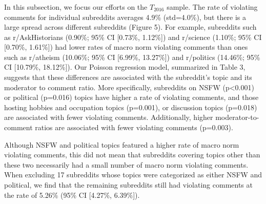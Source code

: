 





\subsubsection{}
In this subsection, we focus our efforts on the $T_{2016}$ sample. The rate of  violating comments for individual subreddits averages 4.9\% (std=4.0\%), but there is a large spread across different subreddits (Figure 5). For example, subreddits such as r/AskHistorians (0.90\%; 95\% CI [0.73\%, 1.12\%]) and r/science (1.10\%; 95\% CI [0.70\%, 1.61\%]) had lower rates of macro norm violating comments than ones such as r/atheism (10.06\%; 95\% CI [6.99\%, 13.27\%]) and r/politics (14.46\%; 95\% CI [10.79\%, 18.12\%]). Our Poisson regression model, summarized in Table 3, suggests that these differences are associated with the subreddit's topic and its moderator to comment ratio. More specifically, subreddits on NSFW (p<0.001) or political (p=0.016) topics have higher a rate of violating comments, and those hosting hobbies and occupation topics (p=0.001), or discussion topics (p=0.018) are associated with fewer violating comments. Additionally, higher moderator-to-comment ratios are associated with fewer violating comments (p=0.003). 

Although NSFW and political topics featured a higher rate of macro norm violating comments, this did not mean that subreddits covering topics other than these two necessarily had a small number of macro norm violating comments. When excluding 17 subreddits whose topics were categorized as either NSFW and political, we find that the remaining subreddits still had violating comments at the rate of 5.26\% (95\% CI [4.27\%, 6.39\%]). 



